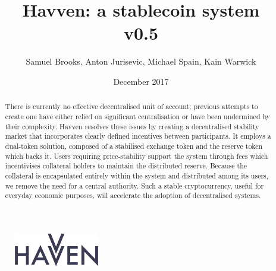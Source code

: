 \documentclass{article}
\theoremstyle{definition}
\theoremstyle{plain} %
\begin{document}
\newcommand{\HAV}{\textsc{hav}}
\newcommand{\NOM}{\textsc{nom}}


\title{Havven: a stablecoin system\\ v0.5}
\author{Samuel Brooks, Anton Jurisevic, Michael Spain, Kain Warwick}
\date{December 2017}


\begin{figure}
    \centering
    \includegraphics[width=0.33\textwidth]{img/havvenlogo}
\end{figure}
\maketitle

\hfill

\begin{abstract}
\noindent There is currently no effective decentralised unit of account; previous attempts to create one have either relied on significant centralisation or have been undermined by their complexity. Havven resolves these issues by creating a decentralised stability market that incorporates clearly defined incentives between participants. It employs a dual-token solution, composed of a stabilised exchange token and the reserve token which backs it. Users requiring price-stability support the system through fees which incentivises collateral holders to maintain the distributed reserve. Because the collateral is encapsulated entirely within the system and distributed among its users, we remove the need for a central authority. Such a stable cryptocurrency, useful for everyday economic purposes, will accelerate the adoption of decentralised systems.

\end{abstract}	


\pagebreak 

\tableofcontents


\pagebreak


%



%
%

%
%
\end{document}
